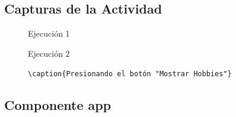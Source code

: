 \documentclass{article}
\begin{document}
  \subsection{Capturas de la Actividad}
  \begin{figure}[H]
    \centering
    \caption{Ejecución 1}
  \end{figure}
  \begin{figure}[H]
    \centering
    \caption{Ejecución 2}
  \end{figure}
  \begin{figure}[H]
    \centering
    \verb|\caption{Presionando el botón "Mostrar Hobbies"}|
  \end{figure}
  

  \subsection{Componente app}
  
\end{document}
